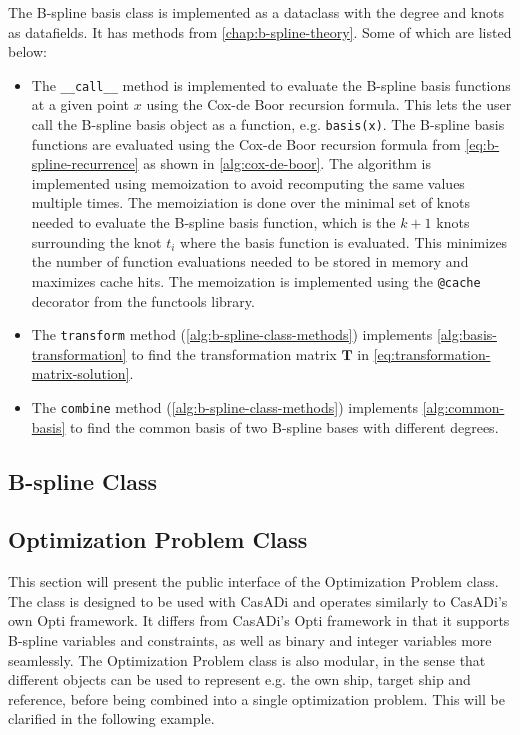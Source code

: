 The B-spline basis class is implemented as a dataclass with the degree and knots as datafields. It has methods from \cref{chap:b-spline-theory}. Some of which are listed below:
\begin{itemize}
    \item 
    The \texttt{\_\_call\_\_} method is implemented to evaluate the B-spline basis functions at a given point $x$ using the Cox-de Boor recursion formula. This lets the user call the B-spline basis object as a function, e.g. \texttt{basis(x)}. The B-spline basis functions are evaluated using the Cox-de Boor recursion formula from \cref{eq:b-spline-recurrence} as shown in \cref{alg:cox-de-boor}. The algorithm is implemented using memoization to avoid recomputing the same values multiple times. The memoiziation is done over the minimal set of knots needed to evaluate the B-spline basis function, which is the $k+1$ knots surrounding the knot $t_i$ where the basis function is evaluated. This minimizes the number of function evaluations needed to be stored in memory and maximizes cache hits. The memoization is implemented using the \texttt{@cache} decorator from the functools library.
    \item
    The \texttt{transform} method (\cref{alg:b-spline-class-methods}) implements \cref{alg:basis-transformation} to find the transformation matrix $\mathbf T$ in \cref{eq:transformation-matrix-solution}.
    \item
    The \texttt{combine} method (\cref{alg:b-spline-class-methods}) implements \cref{alg:common-basis} to find the common basis of two B-spline bases with different degrees. 
\end{itemize}


\FloatBarrier
\subsection{B-spline Class}


\subsection{Optimization Problem Class}
This section will present the public interface of the Optimization Problem class. The class is designed to be used with CasADi and operates similarly to CasADi's own Opti framework. It differs from CasADi's Opti framework in that it supports B-spline variables and constraints, as well as binary and integer variables more seamlessly. The Optimization Problem class is also modular, in the sense that different objects can be used to represent e.g. the own ship, target ship and reference, before being combined into a single optimization problem. This will be clarified in the following example.


